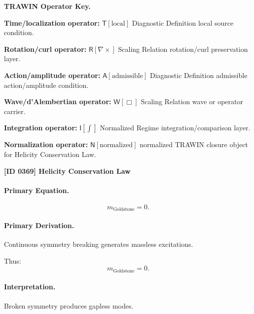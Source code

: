 \par\vspace{0.45\baselineskip}
\noindent\begin{minipage}[t]{\linewidth}
\begingroup
\small
\raggedright
\textbf{TRAWIN Operator Key.}\par
\noindent\textbf{Time/localization operator:} $\mathsf{T}\!\left[\mathrm{local}\right]$ Diagnostic Definition local source condition.\par
\noindent\textbf{Rotation/curl operator:} $\mathsf{R}\!\left[\nabla\times\right]$ Scaling Relation rotation/curl preservation layer.\par
\noindent\textbf{Action/amplitude operator:} $\mathsf{A}\!\left[\mathrm{admissible}\right]$ Diagnostic Definition admissible action/amplitude condition.\par
\noindent\textbf{Wave/d'Alembertian operator:} $\mathsf{W}\!\left[\Box\right]$ Scaling Relation wave or operator carrier.\par
\noindent\textbf{Integration operator:} $\mathsf{I}\!\left[\int\right]$ Normalized Regime integration/comparison layer.\par
\noindent\textbf{Normalization operator:} $\mathsf{N}\!\left[\mathrm{normalized}\right]$ normalized TRAWIN closure object for Helicity Conservation Law.\par
\endgroup
\end{minipage}

\clearpage
\noindent\textbf{[ID 0369] Helicity Conservation Law}\par
\vspace{0.35em}
\paragraph{Primary Equation.}
\begin{equation}
m_{\mathrm{Goldstone}} = 0.
\end{equation}

\paragraph{Primary Derivation.}
Continuous symmetry breaking generates massless excitations.

Thus:
\begin{equation}
\boxed{
m_{\mathrm{Goldstone}} = 0.
}
\end{equation}

\paragraph{Interpretation.}
Broken symmetry produces gapless modes.

